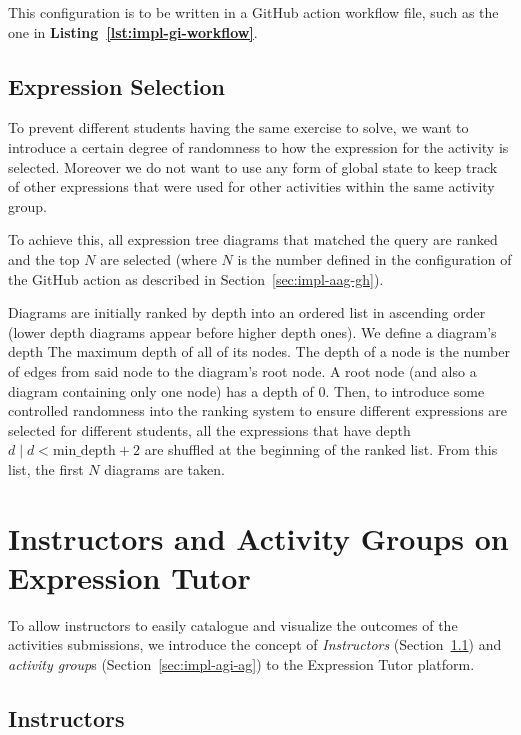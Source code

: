 \begin{chapterBody}
This configuration is to be written in a GitHub action workflow file,
such as the one in \textbf{Listing~\ref{lst:impl-gi-workflow}}.

\subsection{Expression Selection}\label{sec:impl-aag-select}

To prevent different students having the same exercise to solve, we want to
introduce a certain degree of randomness to how the expression for the activity
is selected. Moreover we do not want to use any form of global state to
keep track of other expressions that were used for other activities within the
same activity group.

To achieve this, all expression tree diagrams that matched the query are ranked
and the top $ N $ are selected (where $ N $ is the number defined in the
configuration of the GitHub action as described in
Section~\ref{sec:impl-aag-gh}).

Diagrams are initially ranked by depth into an ordered list in ascending order
(lower depth diagrams appear before higher depth ones).
We define a diagram's depth The maximum depth of all of its nodes.
The depth of a node is the number of edges from said node to the diagram's root
node. A root node (and also a diagram containing only one node) has a depth
of 0. Then, to introduce some controlled randomness into the ranking system to
ensure different expressions are selected for different students, all the
expressions that have depth $ d \mid d < \text{min\_depth} + 2 $ are shuffled at
the beginning of the ranked list.
From this list, the first $ N $ diagrams are taken.

\section{Instructors and Activity Groups on Expression Tutor}\label{sec:impl-agi}

To allow instructors to easily catalogue and visualize the outcomes of the
activities submissions, we introduce the concept of \textit{Instructors}
(Section~\ref{sec:impl-agi-instructors}) and \textit{activity group}s
(Section~\ref{sec:impl-agi-ag}) to the Expression Tutor platform.

\subsection{Instructors}\label{sec:impl-agi-instructors}


\end{chapterBody}
